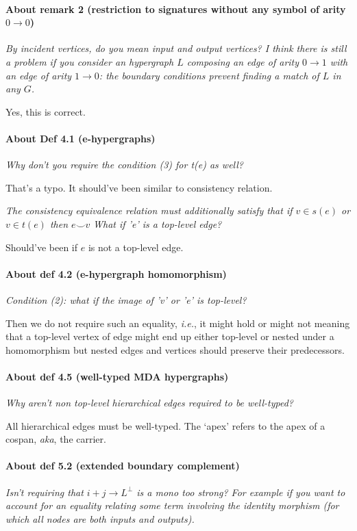 \documentclass{article}
\newcommand{\consistency}{{\smile}}
\begin{document}
\paragraph{About remark 2 (restriction to signatures without any symbol of arity $0 \to 0$)}
\textit{By incident vertices, do you mean input and output vertices? I think there is
still a problem if you consider an hypergraph $L$ composing an edge of arity $0 \to
1$ with an edge of arity $1 \to 0$: the boundary conditions prevent finding a match
of $L$ in any $G$.}

Yes, this is correct.

\paragraph{About Def 4.1 (e-hypergraphs)}
\textit{Why don't you require the condition (3) for t(e) as well?}

That's a typo. It should've been similar to consistency relation.

\textit{The consistency equivalence relation must additionally satisfy that if $v \in s(e)$ or $v \in t(e)$ then $e \consistency v$}
\textit{What if 'e' is a top-level edge?}

Should've been if $e$ is not a top-level edge.

\paragraph{About def 4.2 (e-hypergraph homomorphism)}

\textit{Condition (2): what if the image of 'v' or 'e' is top-level?}

Then we do not require such an equality, \textit{i.e.}, it might hold or might not meaning that a top-level vertex of edge might end up either top-level or nested under a homomorphism but nested edges and vertices should preserve their predecessors.

\paragraph{About def 4.5 (well-typed MDA hypergraphs)}
\textit{Why aren't non top-level hierarchical edges required to be well-typed?}

All hierarchical edges must be well-typed. The `apex' refers to the apex of a cospan, \textit{aka}, the carrier.

\paragraph{About def 5.2 (extended boundary complement)}
\textit{Isn't requiring that $i+j \to L^\bot$ is a mono too strong? For example if you
want to account for an equality relating some term involving the identity
morphism (for which all nodes are both inputs and outputs).}
\end{document}
